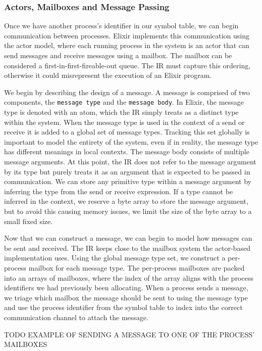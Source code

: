 \subsubsection{Actors, Mailboxes and Message Passing}
Once we have another process's identifier in our symbol table, we can begin communication between processes. Elixir implements this communication using the actor model, where each running process in the system is an actor that can send messages and receive messages using a mailbox. The mailbox can be considered a first-in-first-fireable-out queue. The IR must capture this ordering, otherwise it could misrepresent the execution of an Elixir program.
\par
We begin by describing the design of a message. A message is comprised of two components, the \texttt{message type} and the \texttt{message body}. In Elixir, the message type is denoted with an atom, which the IR simply treats as a distinct type within the system. When the message type is used in the context of a send or receive it is added to a global set of message types. Tracking this set globally is important to model the entirety of the system, even if in reality, the message type has different meanings in local contexts. The message body consists of multiple message arguments. At this point, the IR does not refer to the message argument by its type but purely treats it as an argument that is expected to be passed in communication. We can store any primitive type within a message argument by inferring the type from the send or receive expression. If a type cannot be inferred in the context, we reserve a byte array to store the message argument, but to avoid this causing memory issues, we limit the size of the byte array to a small fixed size.
\par
Now that we can construct a message, we can begin to model how messages can be sent and received. The IR keeps close to the mailbox system the actor-based implementation uses. Using the global message type set, we construct a per-process mailbox for each message type. The per-process mailboxes are packed into an arrays of mailboxes, where the index of the array aligns with the process identifiers we had previously been allocating. When a process sends a message, we triage which mailbox the message should be sent to using the message type and use the process identifier from the symbol table to index into the correct communication channel to attach the message.
\par
TODO EXAMPLE OF SENDING A MESSAGE TO ONE OF THE PROCESS' MAILBOXES
